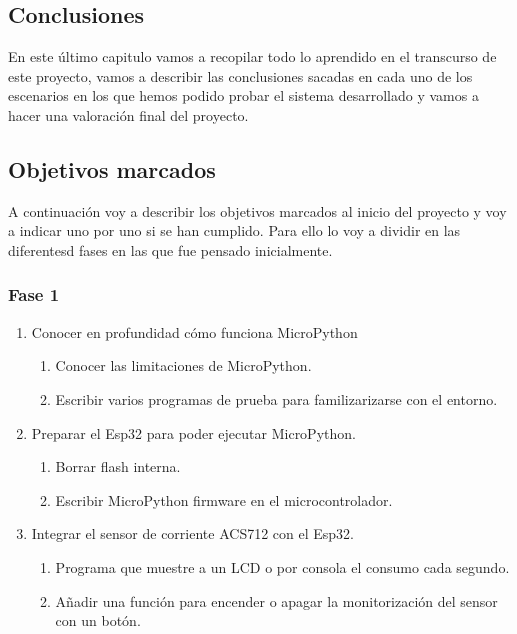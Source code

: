 \begin{titlepage}
\chapter{Conclusiones}
En este último capitulo vamos a recopilar todo lo aprendido en el transcurso de este proyecto, vamos a describir las conclusiones sacadas en cada uno de los escenarios en los que hemos podido probar el sistema desarrollado y vamos a hacer una valoración final del proyecto.\\
\section{Objetivos marcados}
A continuación voy a describir los objetivos marcados al inicio del proyecto y voy a indicar uno por uno si se han cumplido. Para ello lo voy a dividir en las diferentesd fases en las que fue pensado inicialmente.
\subsection{Fase 1}
\begin{enumerate}
    \item Conocer en profundidad cómo funciona MicroPython
    \begin{enumerate}
        \item Conocer las limitaciones de MicroPython. \checkmark
        \item Escribir varios programas de prueba para familizarizarse con el entorno. \checkmark
    \end{enumerate}
    \item Preparar el Esp32 para poder ejecutar MicroPython.
    \begin{enumerate}
        \item Borrar flash interna. \checkmark
        \item Escribir MicroPython firmware en el microcontrolador. \checkmark
    \end{enumerate}
    \item Integrar el sensor de corriente ACS712 con el Esp32. 
    \begin{enumerate}
        \item Programa que muestre a un LCD o por consola el consumo cada segundo. \checkmark
        \item Añadir una función para encender o apagar la monitorización del sensor con un botón.\checkmark
    \end{enumerate}
\end{enumerate}


\end{titlepage}
